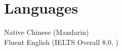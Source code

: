 \documentclass{article}
\newcommand{\cvsection}[1]{\section*{\rmfamily#1}}
\begin{document}
\cvsection{Languages}
\hspace*{2em} Native Chinese (Mandarin) \\
\hspace*{2em} Fluent English (IELTS Overall 8.0, )




\end{document}

